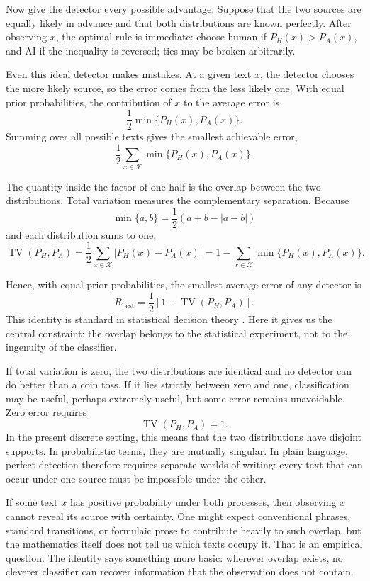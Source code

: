 \documentclass[pdflatex,sn-mathphys-num]{sn-jnl}
\begin{document}
Now give the detector every possible advantage. Suppose that the two sources are equally likely in advance and that both distributions are known perfectly. 
After observing \(x\), the optimal rule is immediate: choose human if \(P_H(x)>P_A(x)\), and AI if the inequality is reversed; ties may be broken arbitrarily.

Even this ideal detector makes mistakes. At a given text \(x\), the detector chooses the more likely source, so the error comes from the less likely one. With equal prior probabilities, the contribution 
of \(x\) to the average error is
\[
\frac12\min\{P_H(x),P_A(x)\}.
\]
Summing over all possible texts gives the smallest achievable error,
\[
\frac12\sum_{x\in\mathcal X}
\min\{P_H(x),P_A(x)\}.
\]

The quantity inside the factor of one-half is the overlap between the two distributions. Total variation measures the complementary separation. Because
\[
\min\{a,b\}=\frac12(a+b-|a-b|)
\]
and each distribution sums to one,
\[
\operatorname{TV}(P_H,P_A)
=\frac12\sum_{x\in\mathcal X}|P_H(x)-P_A(x)|
=1-\sum_{x\in\mathcal X}\min\{P_H(x),P_A(x)\}.
\]

Hence, with equal prior probabilities, the smallest average error of any detector is
\begin{equation}
R_{\mathrm{best}}
=\frac12\left[1-\operatorname{TV}(P_H,P_A)\right].
\label{eq:bayes-risk}
\end{equation}
This identity is standard in statistical decision theory \cite{LeCam1986}. Here it gives us the central constraint: the overlap belongs to the statistical experiment, 
not to the ingenuity of the classifier.

If total variation is zero, the two distributions are identical and no detector can do better than a coin toss. If it lies strictly between zero and one, classification 
may be useful, perhaps extremely useful, but some error remains unavoidable. Zero error requires
\[
\operatorname{TV}(P_H,P_A)=1.
\]
In the present discrete setting, this means that the two distributions have disjoint supports. In probabilistic terms, they 
are mutually singular. In plain language, perfect detection therefore requires separate worlds of writing: every text that can occur under one source must be 
impossible under the other.

If some text \(x\) has positive probability under both processes, then observing \(x\) cannot reveal its source with certainty. One might expect conventional 
phrases, standard transitions, or formulaic prose to contribute heavily to such overlap, but the mathematics itself does not tell us which texts occupy it. That
is an empirical question. The identity says something more basic: wherever overlap exists, no cleverer classifier can recover information that the observation 
does not contain.
\end{document}
